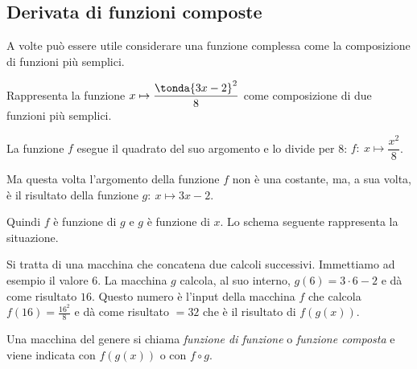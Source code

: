 \subsection{Derivata di funzioni composte}
\label{subsec:differenziazione_derivatacomposta}


A volte può essere utile considerare una funzione complessa come la 
composizione di funzioni più semplici. 

\begin{esempio}
Rappresenta la funzione  \(x \mapsto \dfrac{\tonda{3x -2}^2}{8}\)
come composizione di due funzioni più semplici. 

La funzione \(f\) esegue il quadrato del suo argomento e lo divide per 8:
\(f:~ x \mapsto \dfrac{x^2}{8}\).

Ma questa volta l'argomento della funzione \(f\) non è una costante, ma,
a sua volta, è il risultato della funzione \(g:~x \mapsto 3x -2\).

Quindi \(f\) è funzione di \(g\) e \(g\) è funzione di \(x\).
Lo schema seguente rappresenta la situazione.

\begin{center} \scalebox{1}{\boxfcompostaa} \end{center}
\label{gra:differenziazione_boxcompostaa}

Si tratta di una macchina che concatena due calcoli successivi. 
Immettiamo ad esempio il valore \(6\). 
La macchina \(g\) calcola, al suo interno, \(g(6)=3\cdot 6-2\) e dà come 
risultato \(16\).
Questo numero è l'input della macchina \(f\) che calcola 
\(f(16)=\frac{16^2}{8}\) e dà come risultato \(=32\)
che è il risultato di \(f(g(x))\).
\end{esempio}

Una macchina del genere si chiama \emph{funzione di funzione} o
\emph{funzione composta} e 
viene indicata con \(f(g(x))\) o con \(f \circ g\).



